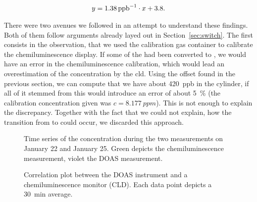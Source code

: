 \begin{align*}
  y = \SI{1.38}{{ppb}\tothe{-1}} \cdot x + 3.8.
\end{align*}

There were two avenues we followed in an attempt to understand these
findings. Both of them follow arguments already layed out in
Section~\ref{sec:switch}. The first consists in the observation, that
we used the  calibration gas container to calibrate the
chemiluminescence display. If some of the  had been converted
to , we would have an error in the chemiluminescence
calibration, which would lead an overestimation of the 
concentration by the cld. Using the 
offset found in the previous section, we can compute that we have
about \SI{420}{ppb}  in the cylinder, if all of it stemmed
from  this would introduce an error of about \SI{5}{\percent}
(the calibration concentration given was $c = \SI{8.177}{ppm}$). This
is not enough to explain the discrepancy. Together with the fact that
we could not explain, how the transition from  to  could
occur, we discarded this approach.

\begin{figure}[htbp]
  \centering
  
  \hfill
  
  \caption{Time series of the  concentration during the two
    measurements on January 22 and January 25. Green depicts the
    chemiluminescence measurement, violet the DOAS measurement.}
  \label{fig:corr-ts}
\end{figure}
\begin{figure}[H]
  \centering
  
  \caption{Correlation plot between the DOAS instrument and a
    chemiluminescence monitor (CLD). Each data point depicts a
    \SI{30}{\minute} average.}
  \label{fig:cld-corr}
\end{figure}

